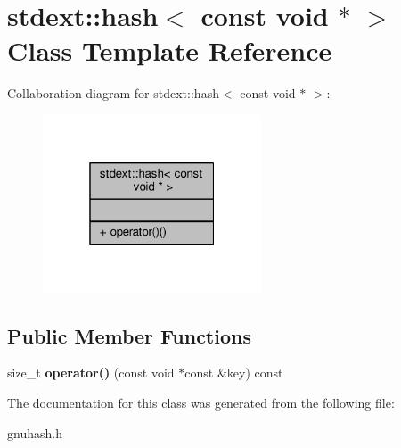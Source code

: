 \hypertarget{classstdext_1_1hash_3_01const_01void_01_5_01_4}{}\section{stdext\+:\+:hash$<$ const void $\ast$ $>$ Class Template Reference}
\label{classstdext_1_1hash_3_01const_01void_01_5_01_4}


Collaboration diagram for stdext\+:\+:hash$<$ const void $\ast$ $>$\+:
\nopagebreak
\begin{figure}[H]
\begin{center}
\leavevmode
\includegraphics[width=184pt]{d5/d51/classstdext_1_1hash_3_01const_01void_01_5_01_4__coll__graph}
\end{center}
\end{figure}
\subsection*{Public Member Functions}
\begin{DoxyCompactItemize}
\item 
size\+\_\+t {\bfseries operator()} (const void $\ast$const \&key) const \hypertarget{classstdext_1_1hash_3_01const_01void_01_5_01_4_a4175463513c684d721a96135ed12dc16}{}\label{classstdext_1_1hash_3_01const_01void_01_5_01_4_a4175463513c684d721a96135ed12dc16}

\end{DoxyCompactItemize}


The documentation for this class was generated from the following file\+:\begin{DoxyCompactItemize}
\item 
gnuhash.\+h\end{DoxyCompactItemize}
